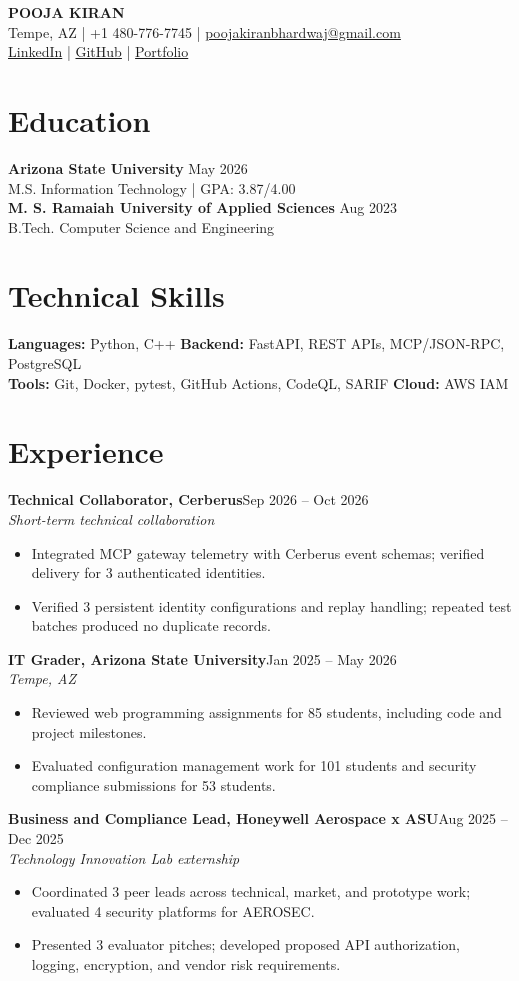 \documentclass[letterpaper,10pt]{article}
\newcommand{\entry}[3]{\textbf{#1}\hfill #2\\[-1pt]\textit{#3}\vspace{-2pt}}
\begin{document}
\fontsize{10}{11.6}\selectfont
\begin{center}
{\fontsize{17}{19}\selectfont\textbf{POOJA KIRAN}}\\[2pt]
Tempe, AZ \quad | \quad +1 480-776-7745 \quad | \quad \href{mailto:poojakiranbhardwaj@gmail.com}{poojakiranbhardwaj@gmail.com}\\[1pt]
\href{https://www.linkedin.com/in/poojakiran}{LinkedIn} \quad | \quad \href{https://github.com/poojakira}{GitHub} \quad | \quad \href{https://poojakira.github.io/Pooja_Kiran_Portfolio_Website/}{Portfolio}
\end{center}
\vspace{-8pt}
\section{Education}
\textbf{Arizona State University} \hfill May 2026\\
M.S. Information Technology \quad | \quad GPA: 3.87/4.00\\[2pt]
\textbf{M. S. Ramaiah University of Applied Sciences} \hfill Aug 2023\\
B.Tech. Computer Science and Engineering
\section{Technical Skills}
\textbf{Languages:} Python, C++ \quad
\textbf{Backend:} FastAPI, REST APIs, MCP/JSON-RPC, PostgreSQL\\
\textbf{Tools:} Git, Docker, pytest, GitHub Actions, CodeQL, SARIF \quad
\textbf{Cloud:} AWS IAM
\section{Experience}
\entry{Technical Collaborator, Cerberus}{Sep 2026 -- Oct 2026}{Short-term technical collaboration}
\begin{itemize}
\item Integrated MCP gateway telemetry with Cerberus event schemas; verified delivery for 3 authenticated identities.
\item Verified 3 persistent identity configurations and replay handling; repeated test batches produced no duplicate records.
\end{itemize}
\entry{IT Grader, Arizona State University}{Jan 2025 -- May 2026}{Tempe, AZ}
\begin{itemize}
\item Reviewed web programming assignments for 85 students, including code and project milestones.
\item Evaluated configuration management work for 101 students and security compliance submissions for 53 students.
\end{itemize}
\entry{Business and Compliance Lead, Honeywell Aerospace x ASU}{Aug 2025 -- Dec 2025}{Technology Innovation Lab externship}
\begin{itemize}
\item Coordinated 3 peer leads across technical, market, and prototype work; evaluated 4 security platforms for AEROSEC.
\item Presented 3 evaluator pitches; developed proposed API authorization, logging, encryption, and vendor risk requirements.
\end{itemize}
\end{document}
